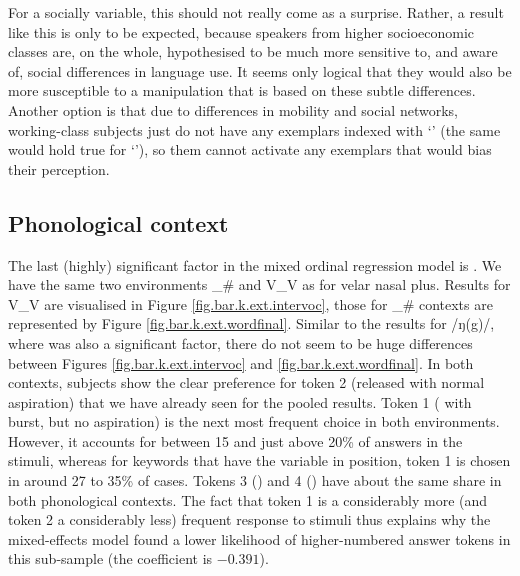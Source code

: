 For a socially  variable, this should not really come as a surprise.
Rather, a result like this is only to be expected, because speakers from higher socioeconomic classes are, on the whole, hypothesised to be much more sensitive to, and aware of, social differences in language use.
It seems only logical that they would also be more susceptible to a manipulation that is based on these subtle differences.
Another option is that due to differences in mobility and social networks, working-class subjects just do not have any exemplars indexed with `' (the same would hold true for `'), so  them cannot activate any exemplars that would bias their perception.

\subsection{Phonological context}
\label{sec.perc_res.k.phon}

The last (highly) significant factor in the mixed ordinal regression model is .
We have the same two environments \_\# and V\_V as for velar nasal plus.
Results for V\_V are visualised in Figure \ref{fig.bar.k.ext.intervoc}, those for \_\# contexts are represented by Figure \ref{fig.bar.k.ext.wordfinal}.
Similar to the results for /ŋ(g)/, where  was also a significant factor, there do not seem to be huge differences between Figures \ref{fig.bar.k.ext.intervoc} and \ref{fig.bar.k.ext.wordfinal}.
In both contexts, subjects show the clear preference for token 2 (released  with normal aspiration) that we have already seen for the pooled results.
Token 1 ( with burst, but no aspiration) is the next most frequent choice in both environments.
However, it accounts for between 15 and just above 20\% of answers in the  stimuli, whereas for keywords that have the variable in  position, token 1 is chosen in around 27 to 35\% of cases.
Tokens 3 () and 4 () have about the same share in both phonological contexts.
The fact that token 1 is a considerably more (and token 2 a considerably less) frequent response to  stimuli thus explains why the mixed-effects model found a lower likelihood of higher-numbered answer tokens in this sub-sample (the coefficient is \ensuremath{-0.391}).

